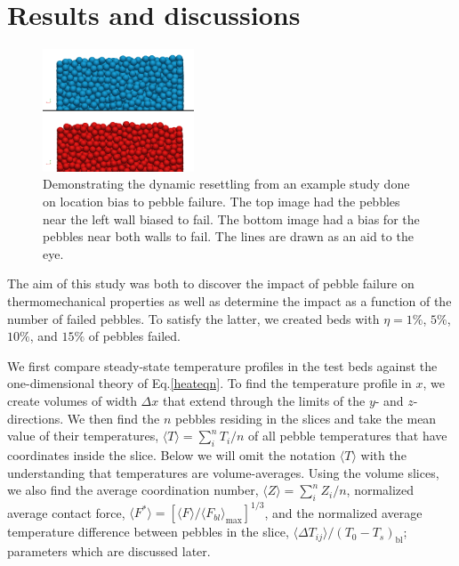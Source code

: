 
\section{Results and discussions}
\label{results}

\begin{figure}[t]
	\centering
	\includegraphics[width=0.4\textwidth]{chapters/figures/settlingStudy}
	\caption{Demonstrating the dynamic resettling from an example study done on location bias to pebble failure. The top image had the pebbles near the left wall biased to fail. The bottom image had a bias for the pebbles near both walls to fail. The lines are drawn as an aid to the eye.}
\label{fig:settlingStudy}
\end{figure}


The aim of this study was both to discover the impact of pebble failure on thermomechanical properties as well as determine the impact as a function of the number of failed pebbles. To satisfy the latter, we created beds with $\eta = 1\%$, $5\%$, $10\%$, and $15\%$ of pebbles failed. 

We first compare steady-state temperature profiles in the test beds against the one-dimensional theory of Eq.\ref{heateqn}. To find the temperature profile in $x$, we create volumes of width $\Delta x$ that extend through the limits of the $y$- and $z$-directions. We then find the $n$ pebbles residing in the slices and take the mean value of their temperatures, $\langle T\rangle = \sum_{i}^n T_i / n$ of all pebble temperatures that have coordinates inside the slice. Below we will omit the notation $\langle T \rangle$ with the understanding that temperatures are volume-averages. Using the volume slices, we also find the average coordination number, $\langle Z \rangle = \sum_{i}^n Z_i / n$, normalized average contact force, $\langle F^* \rangle=\left[\langle F \rangle/\langle F_{bl} \rangle_\text{max}\right]^{1/3}$, and the normalized average temperature difference between pebbles in the slice, $\langle \Delta T_{ij} \rangle / (T_0 - T_s)_\text{bl}$; parameters which are discussed later.


